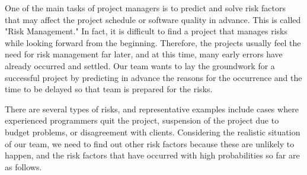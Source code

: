 One of the main tasks of project managers is to predict and solve risk factors that may affect the project schedule or software quality in advance. This is called "Risk Management." In fact, it is difficult to find a project that manages risks while looking forward from the beginning. Therefore, the projects usually feel the need for risk management far later, and at this time, many early errors have already occurred and settled. Our team wants to lay the groundwork for a successful project by predicting in advance the reasons for the occurrence and the time to be delayed so that team is prepared for the risks.

There are several types of risks, and representative examples include cases where experienced programmers quit the project, suspension of the project due to budget problems, or disagreement with clients. Considering the realistic situation of our team, we need to find out other risk factors because these are unlikely to happen, and the risk factors that have occurred with high probabilities so far are as follows.

\begin{table}[h]
\caption{Overview of highest exposure project risks} 
\end{table}